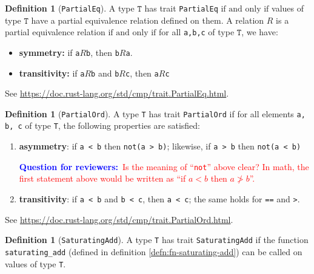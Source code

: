 \documentclass[11pt,a4paper]{article}
\theoremstyle{definition}
\newtheorem{definition}[theorem]{Definition}
\newcommand{\inRust}[2]{See \url{#2}.}
\newcommand{\questionr}[1]{\textcolor{blue}{\textbf{Question for reviewers:}}\textcolor{red}{~#1}}
\newcommand{\T}{\texttt{T}}
\newcommand{\iffText}{\text{if and only if}}
\begin{document}
\begin{definition}[\texttt{PartialEq}]
    A type $\T$ has trait \texttt{PartialEq} $\iffText$ values of type $\T$ have a partial equivalence relation defined on them. A relation $R$ is a partial equivalence relation $\iffText$ for all \texttt{a,b,c} of type $\T$, we have:
    \begin{itemize}
        \item \textbf{symmetry:} if \texttt{a}$R$\texttt{b}, then \texttt{b}$R$\texttt{a}.
        \item \textbf{transitivity:} if \texttt{a}$R$\texttt{b} and \texttt{b}$R$\texttt{c}, then \texttt{a}$R$\texttt{c}
    \end{itemize}
    
    \inRust{Trait std::cmp::PartialEq}{https://doc.rust-lang.org/std/cmp/trait.PartialEq.html}
\end{definition}

\begin{definition}[\texttt{PartialOrd}]\label{def:partial}
A type \texttt{T} has trait \texttt{PartialOrd} if for all elements \texttt{a, b, c} of type \texttt{T}, the following properties are satisfied:

    \begin{enumerate}
        \item \textbf{asymmetry}: if \texttt{a < b} then \texttt{not(a > b)}; likewise, if \texttt{a > b} then \texttt{not(a < b)}
        
        \questionr{Is the meaning of ``\texttt{not}'' above clear? In math, the first statement above would be written as ``if $a < b$ then $a \ngtr b$''.}
        
        \item \textbf{transitivity}: if \texttt{a < b} and \texttt{b < c}, then \texttt{a < c}; the same holds for \texttt{==} and \texttt{>}.
    \end{enumerate}

\inRust{Trait std::cmp::PartialOrd}{https://doc.rust-lang.org/std/cmp/trait.PartialOrd.html}
\end{definition}

\begin{definition}[\texttt{SaturatingAdd}]
    A type \texttt{T} has trait \texttt{SaturatingAdd} if the function \texttt{saturating\_add} (defined in definition \ref{defn:fn-saturating-add}) can be called on values of type \texttt{T}.
\end{definition}
\end{document}
